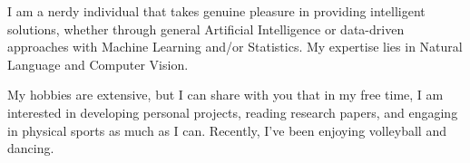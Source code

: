 

\begin{cvparagraph}


\begin{justify}

I am a nerdy individual that takes genuine pleasure in providing intelligent
solutions, whether through general \textcolor{awesome-red}{Artificial
Intelligence} or \textcolor{awesome-red}{data-driven} approaches with
\textcolor{awesome-red}{Machine Learning} and/or
\textcolor{awesome-red}{Statistics}. My expertise lies in
\textcolor{awesome-red}{Natural Language}
and \textcolor{awesome-red}{Computer Vision}.

\noindent My hobbies are extensive, but I can share with you that in my free
time, I am interested in developing personal projects, reading research papers,
and engaging in physical sports as much as I can. Recently, I've been enjoying
volleyball and dancing.

\end{justify}


\end{cvparagraph}
